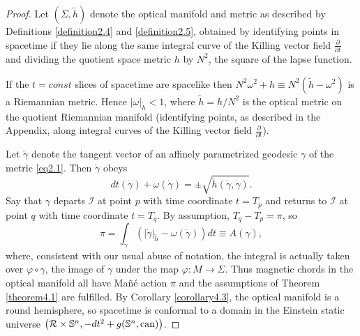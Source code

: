 \documentclass[12pt]{amsart}
\numberwithin{equation}{section}
\begin{document}
\begin{proof}
Let $(\Sigma,{\tilde h})$ denote the optical manifold and metric as described by Definitions \ref{definition2.4} and \ref{definition2.5}, obtained by identifying points in spacetime if they lie along the same integral curve of the Killing vector field $\frac{\partial}{\partial t}$ and dividing the quotient space metric $h$ by $N^2$, the square of the lapse function.

If the $t=const$ slices of spacetime are spacelike then $N^2\omega^2+h\equiv N^2\left ( {\tilde h}-\omega^2\right )$ is a Riemannian metric. Hence $\left \vert \omega \right \vert_{\tilde h} <1$, where ${\tilde h}=h/N^2$ is the optical metric on the quotient Riemannian manifold (identifying points, as described in the Appendix, along integral curves of the Killing vector field $\frac{\partial}{\partial t}$).

Let ${\dot \gamma}$ denote the tangent vector of an affinely parametrized geodesic $\gamma$ of the metric \eqref{eq2.1}. Then ${\dot \gamma}$ obeys
\begin{equation}
\label{eq4.4}
dt\left ( {\dot \gamma}\right )+\omega\left ( {\dot \gamma}\right ) =\pm \sqrt{{\tilde h}\left ( {\dot \gamma},{\dot \gamma} \right )}.
\end{equation}
Say that $\gamma$ departs ${\mathcal I}$ at point $p$ with time coordinate $t=T_p$ and returns to ${\mathcal I}$ at point $q$ with time coordinate $t=T_q$. By assumption, $T_q-T_p=\pi$, so
\begin{equation}
\label{eq4.5}
\pi=\int_{\gamma} \left ( \left \vert {\dot \gamma}\right \vert_{\tilde h} -\omega\left ( {\dot \gamma}\right )\right )dt \equiv A(\gamma),
\end{equation}
where, consistent with our usual abuse of notation, the integral is actually taken over $\varphi\circ\gamma$, the image of $\gamma$ under the map $\varphi:M\to\Sigma$.
Thus magnetic chords in the optical manifold all have Ma\~n\'e action $\pi$ and the assumptions of Theorem \ref{theorem4.1} are fulfilled.
By Corollary \ref{corollary4.3}, the optical manifold is a round hemisphere, so spacetime is conformal to a domain in the Einstein static universe $\left ({\mathcal R}\times {\mathbb S}^n, -dt^2+g({\mathbb S}^n,{\rm can})\right )$.
\end{proof}
\end{document}
